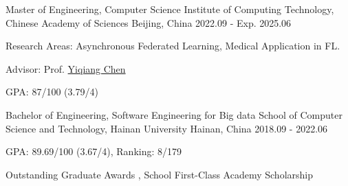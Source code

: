 

\begin{cventries}

\cventry
{Master of Engineering, Computer Science} %
{Institute of Computing Technology, Chinese Academy of Sciences} %
{Beijing, China} %
{2022.09 - Exp. 2025.06} %
{
  \begin{cvitems} %
    \item {Research Areas: Asynchronous Federated Learning, Medical Application in FL.}
    \item {Advisor: Prof. \href{https://www.ict.cas.cn/sourcedb_ict_cas/cn/jssrck/200909/t20090917_2496596.html}{Yiqiang Chen}}
    \item {GPA: 87/100 (3.79/4)}
  \end{cvitems}
}

\cventry
{Bachelor of Engineering, Software Engineering for Big data} %
{School of Computer Science and Technology, Hainan University} %
{Hainan, China} %
{2018.09 - 2022.06} %
{
  \begin{cvitems} %
    \item {GPA: 89.69/100 (3.67/4), Ranking: 8/179 }
    \item {Outstanding Graduate Awards , School First-Class Academy Scholarship }
  \end{cvitems}
}

\end{cventries}
